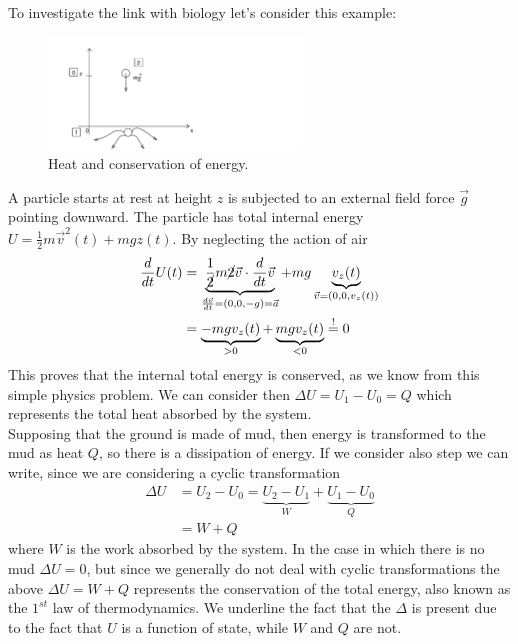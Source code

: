 \documentclass[../main/main.tex]{subfiles}
\begin{document}
To investigate the link with biology let's consider this example:
\begin{figure}[ht!]
    \centering
    \includegraphics[width=0.6\textwidth]{../frontespizio/tikz/0_lesson/00_1.pdf}
    \caption{Heat and conservation of energy.}
\end{figure}
A particle starts at rest at height $z$ is subjected to an external field force $\vec{g}$ pointing downward. The particle has total internal energy $U = \frac{1}{2}m\vec{v}^2(t)+mgz(t)$. By neglecting the action of air
\begin{equation*}
    \begin{split}
        \frac{d}{dt}U(t) & =\underbrace{\frac{1}{\cancel{2}}m\cancel{2}\vec{v}\cdot\frac{d}{dt}\vec{v}}_{\frac{d\vec{v}}{dt}=(0,0,-g)=\vec{a}}+mg\underbrace{v_z(t)}_{\vec{v}=(0,0,v_z(t))}\\
        & = \underbrace{-mgv_z(t)}_{>0}+\underbrace{mgv_z(t)}_{<0}\stackrel{!}{=} 0
    \end{split}
\end{equation*}
This proves that the internal total energy is conserved, as we know from this simple physics problem.
We can consider then $\Delta U = U_1-U_0 = Q$ which represents the total heat absorbed by the system.\\
Supposing that the ground is made of mud, then energy is transformed to the mud as heat $Q$, so there is a dissipation of energy. If we consider also step  we can write, since we are considering a cyclic transformation
\begin{equation}
    \begin{split}
        \Delta U &= U_2-U_0 = \underbrace{U_2-U_1}_{W}+\underbrace{U_1-U_0}_{Q}\\
        &=W+Q
    \end{split}
\end{equation}
where $W$ is the work absorbed by the system. In the case in which there is no mud $\Delta U = 0$, but since we generally do not deal with cyclic transformations the above $\Delta U = W+Q$ represents the conservation of the total energy, also known as the $1^{st}$ law of thermodynamics. We underline the fact that the $\Delta$ is present due to the fact that $U$ is a function of state, while $W$ and $Q$ are not. 
\end{document}
